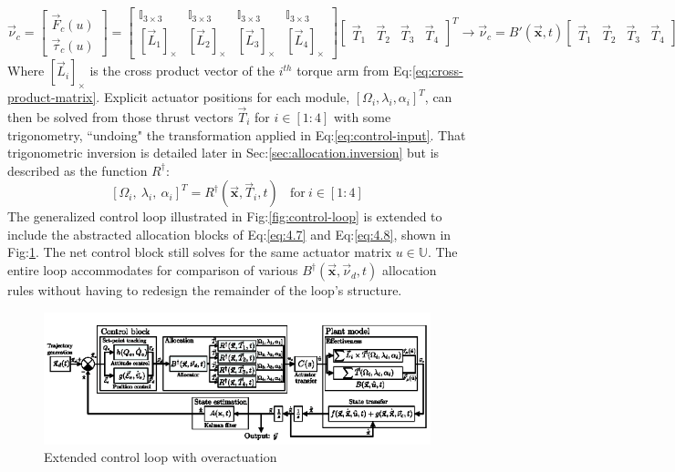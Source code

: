 \begin{subequations}\label{eq:4.7}
\begin{equation}
\vec{\nu}_c=\begin{bmatrix}
\vec{F}_c(u)\\
\vec{\tau}_c(u)
\end{bmatrix}
= 
\begin{bmatrix}
\mathbb{I}_{3\times 3} & \mathbb{I}_{3\times 3} & \mathbb{I}_{3\times 3} & \mathbb{I}_{3\times 3}\\
[\vec{L}_1]_\times & [\vec{L}_2]_\times & [\vec{L}_3]_\times & [\vec{L}_4]_\times
\end{bmatrix}
\begin{bmatrix}
\vec{T}_1&
\vec{T}_2&
\vec{T}_3&
\vec{T}_4
\end{bmatrix}^T
\end{equation}
\begin{equation}
\rightarrow\vec{\nu}_c=B'(\vec{\mathbf{x}},t)\begin{bmatrix}
\vec{T}_1&
\vec{T}_2&
\vec{T}_3&
\vec{T}_4
\end{bmatrix}^T
\end{equation}
\end{subequations}
Where $[\vec{L}_i]_\times$ is the cross product vector of the $i^{th}$ torque arm from Eq:\ref{eq:cross-product-matrix}. Explicit actuator positions for each module, $[\Omega_i,\lambda_i,\alpha_i]^T$, can then be solved from those thrust vectors $\vec{T}_i$ for $i\in[1:4]$ with some trigonometry, ``undoing" the transformation applied in Eq:\ref{eq:control-input}. That trigonometric inversion is detailed later in Sec:\ref{sec:allocation.inversion} but is described as the function $R^\dagger$:
\begin{equation}\label{eq:4.8}
[\Omega_i,~\lambda_i,~\alpha_i]^T=R^\dagger(\vec{\mathbf{x}},\vec{T}_i,t)~~~~\text{for}~i\in[1:4]
\end{equation}
The generalized control loop illustrated in Fig:\ref{fig:control-loop} is extended to include the abstracted allocation blocks of Eq:\ref{eq:4.7} and Eq:\ref{eq:4.8}, shown in Fig:\ref{fig:control-block}. The net control block still solves for the same actuator matrix $u\in\mathbb{U}$. The entire loop accommodates for comparison of various $B^\dagger(\vec{\mathbf{x}},\vec{\nu}_d,t)$ allocation rules without having to redesign the remainder of the loop's structure.
\begin{figure}[htbp]
\vspace{-8pt}
\centering
\includegraphics[width=\textwidth]{figs/control-block}
\caption{Extended control loop with overactuation}
\label{fig:control-block}
\vspace{-16pt}
\end{figure}
